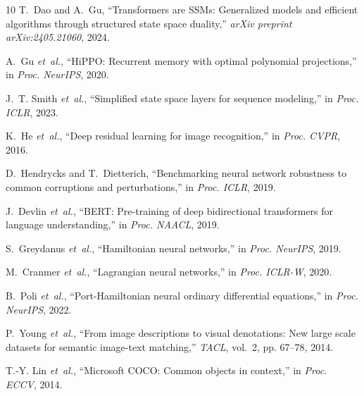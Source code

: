 \documentclass[11pt,journal,onecolumn,draftcls]{IEEEtran}
\begin{document}
\begin{thebibliography}{10}
T.~Dao and A.~Gu, ``Transformers are SSMs: Generalized models and efficient algorithms through structured state space duality,'' \emph{arXiv preprint arXiv:2405.21060}, 2024.

A.~Gu \emph{et~al.}, ``HiPPO: Recurrent memory with optimal polynomial projections,'' in \emph{Proc. NeurIPS}, 2020.

J.~T. Smith \emph{et~al.}, ``Simplified state space layers for sequence modeling,'' in \emph{Proc. ICLR}, 2023.

K.~He \emph{et~al.}, ``Deep residual learning for image recognition,'' in \emph{Proc. CVPR}, 2016.

D.~Hendrycks and T.~Dietterich, ``Benchmarking neural network robustness to common corruptions and perturbations,'' in \emph{Proc. ICLR}, 2019.

J.~Devlin \emph{et~al.}, ``BERT: Pre-training of deep bidirectional transformers for language understanding,'' in \emph{Proc. NAACL}, 2019.

S.~Greydanus \emph{et~al.}, ``Hamiltonian neural networks,'' in \emph{Proc. NeurIPS}, 2019.

M.~Cranmer \emph{et~al.}, ``Lagrangian neural networks,'' in \emph{Proc. ICLR-W}, 2020.

B.~Poli \emph{et~al.}, ``Port-Hamiltonian neural ordinary differential equations,'' in \emph{Proc. NeurIPS}, 2022.

P.~Young \emph{et~al.}, ``From image descriptions to visual denotations: New large scale datasets for semantic image-text matching,'' \emph{TACL}, vol.~2, pp. 67--78, 2014.

T.-Y. Lin \emph{et~al.}, ``Microsoft COCO: Common objects in context,'' in \emph{Proc. ECCV}, 2014.
\end{thebibliography}
\end{document}
